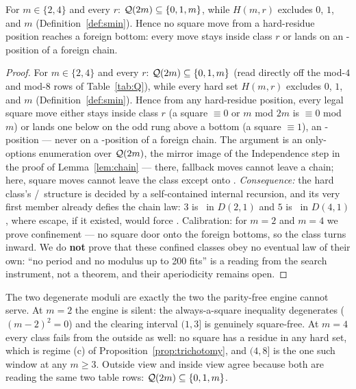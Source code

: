 \begin{lemma}\label{lem:confine}
For $m \in \{2,4\}$ and every $r$: $\mathcal{Q}(2m) \subseteq \{0,1,m\}$, while
$H(m,r)$ excludes $0$, $1$, and $m$ (Definition~\ref{def:smin}). Hence no square move from a
hard-residue position reaches a foreign bottom: every move stays inside class
$r$ or lands on an \NN-position of a foreign chain.
\end{lemma}
\begin{proof}
For $m \in \{2, 4\}$ and every $r$: $\mathcal{Q}(2m) \subseteq \{0, 1, m\}$ (read directly off the mod-$4$ and mod-$8$ rows of Table~\ref{tab:Q}),
while every hard set $H(m, r)$ excludes $0$, $1$, and $m$
(Definition~\ref{def:smin}). Hence from any hard-residue position,
every legal square move either stays inside class $r$ (a square $\equiv
0$ or $m$ mod $2m$ is $\equiv 0$ mod $m$) or lands one below on the odd
rung above a bottom (a square $\equiv 1$), an \NN-position --- never on a
\PP-position of a foreign chain. The argument is an only-options enumeration
over $\mathcal{Q}(2m)$, the mirror image of the Independence step in the proof of
Lemma~\ref{lem:chain} --- there,
fallback moves cannot leave a chain; here, square moves cannot leave the
class except onto \NN. \emph{Consequence:} the hard class's \PP/\NN\
structure is decided by a self-contained internal recursion, and its very
first member already defies the chain law: $3$ is \PP\ in $D(2,1)$ and
$5$ is \PP\ in $D(4,1)$, where escape, if it existed, would force \NN.
Calibration: for $m = 2$ and $m = 4$ we prove
confinement --- no square door onto the foreign bottoms, so the class
turns inward. We do \textbf{not} prove that these confined classes obey no
eventual law of their own: ``no period and no modulus up to 200 fits'' is
a reading from the search instrument, not a theorem, and their
aperiodicity remains open.
\end{proof}

\begin{remark}\label{rem:double-condemnation}
The two degenerate moduli are exactly the two the parity-free engine cannot
serve. At $m = 2$ the engine is silent: the always-a-square inequality
degenerates ($(m - 2)^2 = 0$) and the clearing interval $(1, 3]$ is
genuinely square-free. At $m = 4$ every class fails from the outside as
well: no square has a residue in any hard set, which is regime (c) of
Proposition~\ref{prop:trichotomy}, and $(4, 8]$ is the one such window at
any $m \ge 3$. Outside view and inside view
agree because both are reading the same two table rows: $\mathcal{Q}(2m)
\subseteq \{0, 1, m\}$.
\end{remark}

